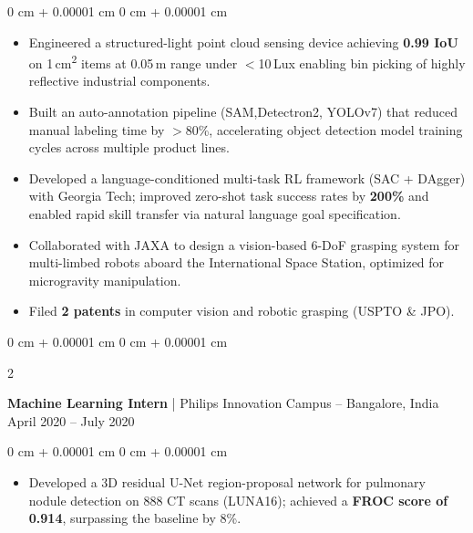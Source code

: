 \documentclass[10pt, letterpaper]{article}
\newenvironment{highlights}{
    \begin{itemize}[
        topsep=0.10 cm,
        parsep=0.10 cm,
        partopsep=0pt,
        itemsep=0pt,
        leftmargin=0 cm + 10pt
    ]
}{
    \end{itemize}
} %
\newenvironment{onecolentry}{
    \begin{adjustwidth}{
        0 cm + 0.00001 cm
    }{
        0 cm + 0.00001 cm
    }
}{
    \end{adjustwidth}
} %
\newenvironment{twocolentry}[2][]{
    \onecolentry
    \def\secondColumn{#2}
    \setcolumnwidth{\fill, 4.5 cm}
    \begin{paracol}{2}
}{
    \switchcolumn \raggedleft \secondColumn
    \end{paracol}
    \endonecolentry
} %
\begin{document}
        \vspace{0.05 cm}
        \begin{onecolentry}
            \begin{highlights}
                \item Engineered a structured-light point cloud sensing device achieving \textbf{0.99 IoU} on 1\,cm\textsuperscript{2} items at 0.05\,m range under $<$10\,Lux enabling bin picking of highly reflective industrial components.
                \item Built an auto-annotation pipeline (SAM,Detectron2, YOLOv7) that reduced manual labeling time by $>$80\%, accelerating object detection model training cycles across multiple product lines.
                \item Developed a language-conditioned multi-task RL framework (SAC + DAgger) with Georgia Tech; improved zero-shot task success rates by \textbf{200\%} and enabled rapid skill transfer via natural language goal specification.
                \item Collaborated with JAXA to design a vision-based 6-DoF grasping system for multi-limbed robots aboard the International Space Station, optimized for microgravity manipulation.
                \item Filed \textbf{2 patents} in computer vision and robotic grasping (USPTO \& JPO).
            \end{highlights}
        \end{onecolentry}


        \vspace{0.1 cm}

        \begin{twocolentry}{
            April 2020 – July 2020
        }
            \textbf{Machine Learning Intern} | Philips Innovation Campus -- Bangalore, India\end{twocolentry}

        \vspace{0.05 cm}
        \begin{onecolentry}
            \begin{highlights}
                \item Developed a 3D residual U-Net region-proposal network for pulmonary nodule detection on 888 CT scans (LUNA16); achieved a \textbf{FROC score of 0.914}, surpassing the baseline by 8\%.
            \end{highlights}
        \end{onecolentry}
\end{document}
